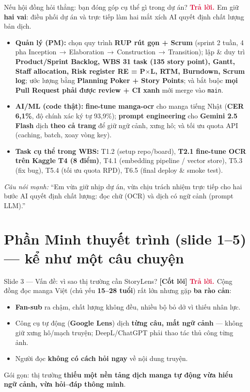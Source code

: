 \documentclass[11pt]{article}
\newcommand{\arr}{\,\ensuremath{\rightarrow}\,}
\newcommand{\x}{\ensuremath{\times}}
\newcommand{\code}[1]{\texttt{\small #1}}
\newcommand{\tagCore}{\textcolor{steel}{\footnotesize\textbf{[Cốt lõi]}}}
\newcommand{\A}{\textbf{\textcolor{crimson}{Trả lời. }}}
\begin{document}
\begin{qa}{Nếu hội đồng hỏi thẳng: bạn đóng góp cụ thể gì trong dự án?}
\A Em giữ \textbf{hai vai}: điều phối dự án và trực tiếp làm hai mắt xích AI quyết định chất lượng bản dịch.
\begin{itemize}
  \item \textbf{Quản lý (PM):} chọn quy trình \textbf{RUP rút gọn + Scrum} (sprint 2 tuần, 4 pha Inception\arr Elaboration\arr Construction\arr Transition); lập \& duy trì \textbf{Product/Sprint Backlog, WBS 31 task (135 story point), Gantt, Staff allocation, Risk register RE = P\x L, RTM, Burndown, Scrum log}; ước lượng bằng \textbf{Planning Poker + Story Points}; và bắt buộc \textbf{mọi Pull Request phải được review + CI xanh} mới merge vào \code{main}.
  \item \textbf{AI/ML (code thật):} \textbf{fine-tune manga-ocr} cho manga tiếng Nhật (\textbf{CER 6,1\%}, độ chính xác ký tự 93,9\%); \textbf{prompt engineering} cho \textbf{Gemini 2.5 Flash} dịch \textbf{theo cả trang} để giữ ngữ cảnh, xưng hô; và tối ưu quota API (caching, batch, xoay vòng key).
  \item \textbf{Task cụ thể trong WBS:} T1.2 (setup repo/board), \textbf{T2.1 fine-tune OCR trên Kaggle T4 (8 điểm)}, T4.1 (embedding pipeline / vector store), T5.3 (fix bug), T5.4 (tối ưu quota RPD), T6.5 (final deploy \& smoke test).
\end{itemize}
\textit{Câu nói mạnh:} ``Em vừa giữ nhịp dự án, vừa chịu trách nhiệm trực tiếp cho hai bước AI quyết định chất lượng: đọc chữ (OCR) và dịch có ngữ cảnh (prompt LLM).''
\end{qa}

\section{Phần Minh thuyết trình (slide 1--5) --- kể như một câu chuyện}

\begin{qa}{Slide 3 --- Vấn đề: vì sao thị trường cần StoryLens? \tagCore}
\A Cộng đồng đọc manga Việt (chủ yếu \textbf{15--28 tuổi}) rất lớn nhưng gặp \textbf{ba rào cản}:
\begin{itemize}
  \item \textbf{Fan-sub} ra chậm, chất lượng không đều, nhiều bộ bỏ dở vì thiếu nhân lực.
  \item Công cụ tự động (\textbf{Google Lens}) dịch \textbf{từng câu, mất ngữ cảnh} --- không giữ xưng hô/mạch truyện; DeepL/ChatGPT phải thao tác thủ công từng ảnh.
  \item Người đọc \textbf{không có cách hỏi ngay} về nội dung truyện.
\end{itemize}
Gói gọn: thị trường \textbf{thiếu một nền tảng dịch manga tự động vừa hiểu ngữ cảnh, vừa hỏi--đáp thông minh}.
\end{qa}
\end{document}
